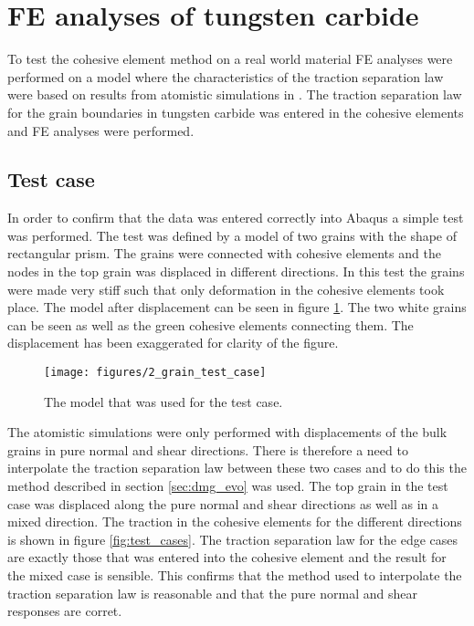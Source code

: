 \documentclass[wcco.tex]{subfiles}
\begin{document}
\FloatBarrier


\section{FE analyses of tungsten carbide}

To test the cohesive element method on a real world material FE analyses were performed on a model where the characteristics of the traction separation law were based on results from atomistic simulations in \cite{Gren2013}. The traction separation law for the grain boundaries in tungsten carbide was entered in the cohesive elements and FE analyses were performed.
 
\subsection{Test case} 
  In order to confirm that the data was entered correctly into Abaqus a simple test was performed. The test was defined by a model of two grains with the shape of rectangular prism. The grains were connected with cohesive elements and the nodes in the top grain was displaced in different directions. In this test the grains were made very stiff such that only deformation in the cohesive elements took place. The model after displacement can be seen in figure \ref{fig:2_grain_test_case}. The two white grains can be seen as well as the green cohesive elements connecting them. The displacement has been exaggerated for clarity of the figure.

\begin{figure}[ht]
\centering
\texttt{[image: figures/2\_grain\_test\_case]}
\caption{The model that was used for the test case.}
\label{fig:2_grain_test_case}
\end{figure}

The atomistic simulations were only performed with displacements of the bulk grains in pure normal and shear directions. There is therefore a need to interpolate the traction separation law between these two cases and to do this the method described in section \ref{sec:dmg_evo} was used. The top grain in the test case was displaced along the pure normal and shear directions as well as in a mixed direction. The traction in the cohesive elements for the different directions is shown in figure \ref{fig:test_cases}. The traction separation law for the edge cases are exactly those that was entered into the cohesive element and the result for the mixed case is sensible. This confirms that the method used to interpolate the traction separation law is reasonable and that the pure normal and shear responses are corret.
\end{document}
